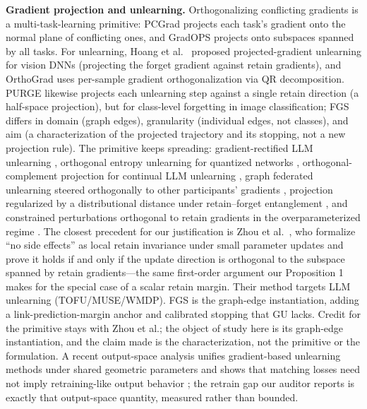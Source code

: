 \documentclass[pdflatex,sn-basic,Numbered]{sn-jnl}
\begin{document}
\textbf{Gradient projection and unlearning.} Orthogonalizing conflicting gradients is a multi-task-learning primitive: PCGrad \cite{pcgrad2020} projects each task's gradient onto the normal plane of conflicting ones, and GradOPS \cite{gradops2025} projects onto subspaces spanned by all tasks. For unlearning, Hoang et al.\ \cite{hoang2024} proposed projected-gradient unlearning for vision DNNs (projecting the forget gradient against retain gradients), and OrthoGrad \cite{orthograd2025} uses per-sample gradient orthogonalization via QR decomposition. PURGE \cite{jawandhia2026} likewise projects each unlearning step against a single retain direction (a half-space projection), but for class-level forgetting in image classification; FGS differs in domain (graph edges), granularity (individual edges, not classes), and aim (a characterization of the projected trajectory and its stopping, not a new projection rule). The primitive keeps spreading: gradient-rectified LLM unlearning \cite{gru2025}, orthogonal entropy unlearning for quantized networks \cite{oeu2026}, orthogonal-complement projection for continual LLM unlearning \cite{cop2026}, graph federated unlearning steered orthogonally to other participants' gradients \cite{gfu2026}, projection regularized by a distributional distance under retain--forget entanglement \cite{entanglement2026}, and constrained perturbations orthogonal to retain gradients in the overparameterized regime \cite{minnormog2025}. The closest precedent for our justification is Zhou et al.\ \cite{gu2025}, who formalize ``no side effects'' as local retain invariance under small parameter updates and prove it holds if and only if the update direction is orthogonal to the subspace spanned by retain gradients---the same first-order argument our Proposition 1 makes for the special case of a scalar retain margin. Their method targets LLM unlearning (TOFU/MUSE/WMDP). FGS is the graph-edge instantiation, adding a link-prediction-margin anchor and calibrated stopping that GU lacks. Credit for the primitive stays with Zhou et al.; the object of study here is its graph-edge instantiation, and the claim made is the characterization, not the primitive or the formulation. A recent output-space analysis unifies gradient-based unlearning methods under shared geometric parameters and shows that matching losses need not imply retraining-like output behavior \cite{lossnotbehavior2026}; the retrain gap our auditor reports is exactly that output-space quantity, measured rather than bounded.
\end{document}
